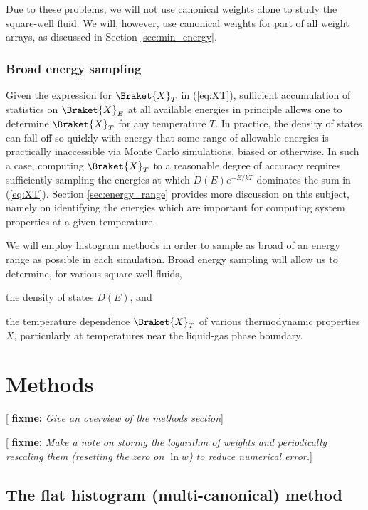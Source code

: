 \documentclass[11pt]{article}
\newcommand{\bk}{\Braket} %
\newcommand{\p}[1]{\left(#1\right)} %
\newcommand{\red}[1]{{\bf \color{red} #1}}
\newcommand{\fixme}[1]{[\red{fixme:} \emph{#1}]}
\begin{document}
Due to these problems, we will not use canonical weights alone to
study the square-well fluid. We will, however, use canonical weights
for part of all weight arrays, as discussed in Section
\ref{sec:min_energy}.

\subsubsection{Broad energy sampling}
\label{sec:broad_energy_sampling}

Given the expression for $\bk{X}_T$ in (\ref{eq:XT}), sufficient
accumulation of statistics on $\bk{X}_E$ at all available energies in
principle allows one to determine $\bk{X}_T$ for any temperature
$T$. In practice, the density of states can fall off so quickly with
energy that some range of allowable energies is practically
inaccessible via Monte Carlo simulations, biased or otherwise. In such
a case, computing $\bk{X}_T$ to a reasonable degree of accuracy
requires sufficiently sampling the energies at which $\tilde
D\p{E}e^{-E/kT}$ dominates the sum in (\ref{eq:XT}). Section
\ref{sec:energy_range} provides more discussion on this subject,
namely on identifying the energies which are important for computing
system properties at a given temperature.

We will employ histogram methods in order to sample as broad of an
energy range as possible in each simulation. Broad energy sampling
will allow us to determine, for various square-well fluids,
\begin{enumerate*}[label=\roman*)]
\item the density of states $D\p{E}$, and
\item the temperature dependence $\bk{X}_T$ of various thermodynamic
  properties $X$, particularly at temperatures near the liquid-gas
  phase boundary.
\end{enumerate*}


\section{Methods}
\label{sec:methods}

\fixme{Give an overview of the methods section}

\fixme{Make a note on storing the logarithm of weights and
  periodically rescaling them (resetting the zero on $\ln w$) to
  reduce numerical error.}

\subsection{The flat histogram (multi-canonical) method}
\label{sec:flat_histogram}
\end{document}
